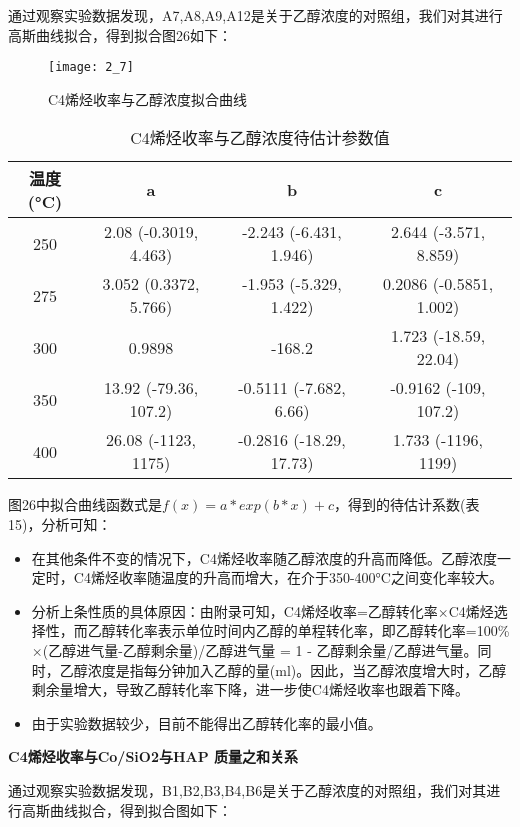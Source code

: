 \documentclass[withoutpreface,bwprint]{cumcmthesis} %
\begin{document}
通过观察实验数据发现，A7,A8,A9,A12是关于乙醇浓度的对照组，我们对其进行高斯曲线拟合，得到拟合图26如下：
\begin{figure}[!h]
	\centering
	\texttt{[image: 2\_7]}
	\caption{C4烯烃收率与乙醇浓度拟合曲线}
	\label{fig:circuit-diagram1}
\end{figure}
\begin{table}[!htbp]
	\caption{C4烯烃收率与乙醇浓度待估计参数值}\label{tab:001} \centering
	\begin{tabular}{cccc}
		\toprule[1.5pt]
		温度(°C) & a & b & c \\
		\midrule[1pt]
		250 &  2.08  (-0.3019, 4.463) &  -2.243  (-6.431, 1.946) &  2.644  (-3.571, 8.859) \\
		275 & 3.052  (0.3372, 5.766) &   -1.953  (-5.329, 1.422) &0.2086  (-0.5851, 1.002) \\
		300 &0.9898 & -168.2 &   1.723  (-18.59, 22.04) \\
		350 &  13.92  (-79.36, 107.2) & -0.5111  (-7.682, 6.66) & -0.9162  (-109, 107.2) \\
		400 &   26.08  (-1123, 1175) & -0.2816  (-18.29, 17.73) &  1.733  (-1196, 1199)  \\
		\bottomrule[1.5pt]
	\end{tabular}
\end{table}

图26中拟合曲线函数式是$f(x) = a*exp(b*x)+c$，得到的待估计系数(表15)，分析可知：
\begin{itemize}
	\item 在其他条件不变的情况下，C4烯烃收率随乙醇浓度的升高而降低。乙醇浓度一定时，C4烯烃收率随温度的升高而增大，在介于350-400°C之间变化率较大。
	\item 分析上条性质的具体原因：由附录可知，C4烯烃收率=乙醇转化率$\times$C4烯烃选择性，而乙醇转化率表示单位时间内乙醇的单程转化率，即乙醇转化率=100\% $\times$(乙醇进气量-乙醇剩余量)/乙醇进气量 = 1 - 乙醇剩余量/乙醇进气量。同时，乙醇浓度是指每分钟加入乙醇的量(ml)。因此，当乙醇浓度增大时，乙醇剩余量增大，导致乙醇转化率下降，进一步使C4烯烃收率也跟着下降。
	\item 由于实验数据较少，目前不能得出乙醇转化率的最小值。
\end{itemize}



\textbf{C4烯烃收率与Co/SiO2与HAP 质量之和关系}

通过观察实验数据发现，B1,B2,B3,B4,B6是关于乙醇浓度的对照组，我们对其进行高斯曲线拟合，得到拟合图如下：
\end{document}
